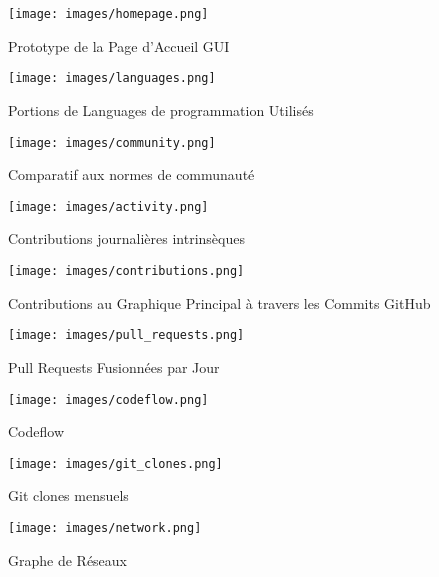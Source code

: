 \begin{figure}[htbp]
    \centering
    \texttt{[image: images/homepage.png]}
    \caption{Prototype de la Page d'Accueil GUI}
    \label{fig:homepage}
\end{figure}

\begin{figure}[htbp]
    \centering
    \texttt{[image: images/languages.png]}
    \caption{Portions de Languages de programmation Utilisés}
    \label{fig:languages}
\end{figure}

\begin{figure}[htbp]
    \centering
    \texttt{[image: images/community.png]}
    \caption{Comparatif aux normes de communauté}
    \label{fig:community}
\end{figure}

\begin{figure}[htbp]
    \centering
    \texttt{[image: images/activity.png]}
    \caption{Contributions journalières intrinsèques}
    \label{fig:contributions}
\end{figure}

\begin{figure}[htbp]
    \centering
    \texttt{[image: images/contributions.png]}
    \caption{Contributions au Graphique Principal à travers les Commits GitHub}
    \label{fig:contributions}
\end{figure}

\begin{figure}[htbp]
    \centering
    \texttt{[image: images/pull\_requests.png]}
    \caption{Pull Requests Fusionnées par Jour}
    \label{fig:pull_requests}
\end{figure}

\begin{figure}[htbp]
    \centering
    \texttt{[image: images/codeflow.png]}
    \caption{Codeflow}
    \label{fig:codeflow}
\end{figure}

\begin{figure}[htbp]
    \centering
    \texttt{[image: images/git\_clones.png]}
    \caption{Git clones mensuels}
    \label{fig:git_clones}
\end{figure}

\begin{figure}[htbp]
    \centering
    \texttt{[image: images/network.png]}
    \caption{Graphe de Réseaux}
    \label{fig:network}
\end{figure}


